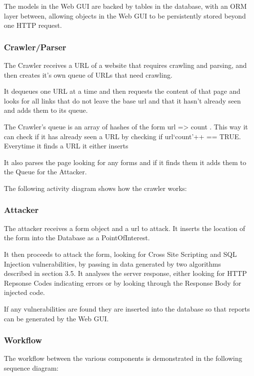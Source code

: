 \documentclass[12pt,a4paper]{article}
\begin{document}
The models in the Web GUI are backed by tables in the database, with an ORM layer between, allowing objects in the Web GUI to be persistently stored beyond one HTTP request.

\subsubsection{Crawler/Parser}
The Crawler receives a URL of a website that requires crawling and parsing, and then creates it’s own queue of URLs that need crawling.  

It dequeues one URL at a time and then requests the content of that page and looks for all links that do not leave the base url and that it hasn’t already seen and adds them to its queue.

The Crawler’s queue is an array of hashes of the form { url => count }.  This way it can check if it has already seen a URL by checking if url{‘count’}++ == TRUE.  Everytime it finds a URL it either inserts 

It also parses the page looking for any forms and if it finds them it adds them to the Queue for the Attacker.

The following activity diagram shows how the crawler works:


\subsubsection{Attacker}
The attacker receives a form object and a url to attack.  It inserts the location of the form into the Database as a PointOfInterest.  

It then proceeds to attack the form, looking for Cross Site Scripting and SQL Injection vulnerabilities, by passing in data generated by two algorithms described in section 3.5.  It analyses the server response, either looking for HTTP Repsonse Codes indicating errors or by looking through the Response Body for injected code.

If any vulnerabilities are found they are inserted into the database so that reports can be generated by the Web GUI.

\subsubsection{Workflow}
The workflow  between the various components is demonstrated in the following sequence diagram:

\end{document}

